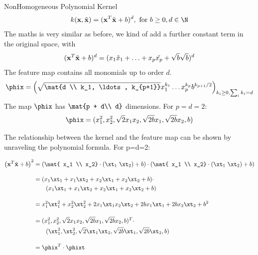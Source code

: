 \documentclass[11pt,compress,t,notes=noshow, xcolor=table]{beamer}
\begin{document}
\begin{vbframe}{NonHomogeneous Polynomial Kernel}
 $$k(\xv, \xtil) = (\xv^T \xtil + b)^d, \text{ for } b\geq 0, d \in \N$$
The maths is very similar as before, we kind of add a further constant term in the original space, with
$$ (\mathbf{x}^T \tilde{\mathbf{x}} + b)^d = (x_1 \tilde{x}_1 + \ldots + x_p \tilde{x_p} + \sqrt{b} \sqrt{b})^d$$
The feature map contains all monomials up to order $d$.
  $$\phix = \left( \sqrt{\mat{d \\ k_1, \ldots, k_{p+1}}} x_1^{k_1} \ldots x_p^{k_p} b^{k_{p+1}/2} \right)_{k_i \geq 0, \sum_i k_i = d}$$
The map $\phix$ has $\mat{p + d\\ d}$ dimensions. For $p=d=2$: 
$$\phix = (x_1^2, x_2^2, \sqrt{2} x_1 x_2, \sqrt{2b} x_1, \sqrt{2b} x_2, b)$$

\framebreak
  The relationship between the kernel and the feature map can be shown by unraveling the polynomial formula. For p=d=2:
  
  \begin{equation*}
    \begin{aligned}
        \left ( \xv^T \xtil + b  \right)^2 &=       \left ( \mat{ x_1 \\ x_2} \cdot (\xt_1 \ \xt_2) + b  \right) \cdot      \left ( \mat{ x_1 \\ x_2} \cdot (\xt_1 \ \xt_2) + b  \right) \\[10pt]
        &= (x_1 \xt_1 + x_1 \xt_2 + x_2 \xt_1 + x_2 \xt_2 + b) \cdot \\
         & \ \ \ \ \ \ (x_1 \xt_1 + x_1 \xt_2 + x_2 \xt_1 + x_2 \xt_2 + b) \\[10pt]
        &= x_1^2 \xt_1^2 + x_2^2 \xt_2^2  +  2  x_1 \xt_1 x_2 \xt_2  + 2 b x_1 \xt_1 + 2 b x_2 \xt_2  + b^2 \\[10pt]
        &= ( x_1^2 , x_2^2 , \sqrt{2} x_1 x_2 , \sqrt{2b} x_1 , \sqrt{2b} x_2 , b )^T \cdot \\
        & \ \ \ \ \ \  ( \xt_1^2 , \xt_2^2 ,\sqrt{2} \xt_1 \xt_2 , \sqrt{2b} \xt_1 , \sqrt{2b} \xt_2 ,  b ) \\[10pt]
        &= \phix^T \cdot \phixt
    \end{aligned}
  \end{equation*}
\end{vbframe}
\end{document}
